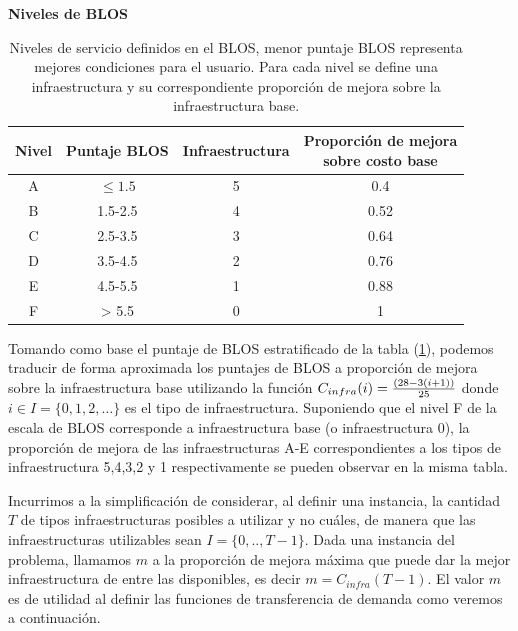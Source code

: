 \documentclass{article}
\begin{document}
  \begin{table}[h!]
    \centering
    \caption*{{\bf Niveles de BLOS}}
    \begin{tabular}{cccc}
      \toprule
        Nivel & Puntaje BLOS & Infraestructura & \shortstack{Proporción de mejora \\ sobre costo base} \\
      \midrule
        A     & $\leq 1.5$   & 5              & 0.4   \\
        B     & 1.5-2.5      & 4              & 0.52  \\
        C     & 2.5-3.5      & 3              & 0.64  \\
        D     & 3.5-4.5      & 2              & 0.76  \\
        E     & 4.5-5.5      & 1              & 0.88  \\
        F     & > 5.5        & 0              & 1     \\
      \bottomrule
    \end{tabular}
    \caption{Niveles de servicio definidos en el BLOS, menor puntaje BLOS representa mejores condiciones para el usuario. Para cada nivel se define una infraestructura y su correspondiente proporción de mejora sobre la infraestructura base.}\label{table:blosscores}
  \end{table}

  Tomando como base el puntaje de BLOS estratificado de la tabla (\ref{table:blosscores}), podemos traducir de forma aproximada los puntajes de BLOS a proporción de mejora sobre la infraestructura base utilizando la función $C_{infra}(i) = {(28 - 3 (i + 1)) \over 25}$ donde $i \in I = \{0,1,2,\ldots\}$ es el tipo de infraestructura. Suponiendo que el nivel F de la escala de BLOS corresponde a infraestructura base (o infraestructura 0), la proporción de mejora de las infraestructuras A-E correspondientes a los tipos de infraestructura 5,4,3,2 y 1 respectivamente se pueden observar en la misma tabla.

  Incurrimos a la simplificación de considerar, al definir una instancia, la cantidad $T$ de tipos infraestructuras posibles a utilizar y no cuáles, de manera que las infraestructuras utilizables sean $I = \{0,.., T - 1\}$. Dada una instancia del problema, llamamos $m$ a la proporción de mejora máxima que puede dar la mejor infraestructura de entre las disponibles, es decir $m = C_{infra}(T - 1)$. El valor $m$ es de utilidad al definir las funciones de transferencia de demanda como veremos a continuación.
\end{document}
